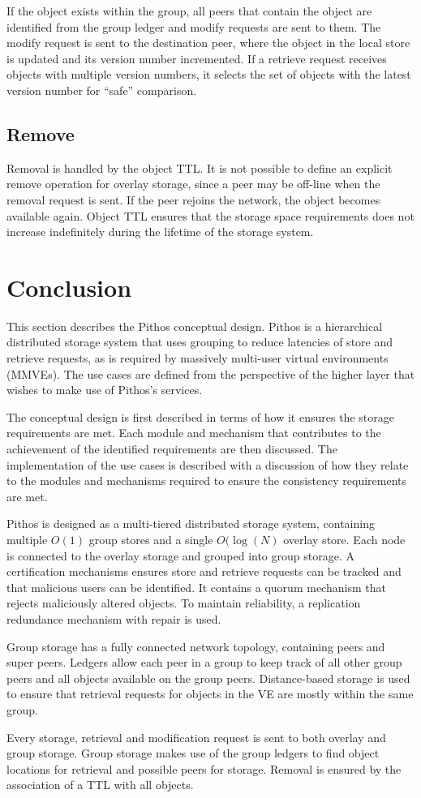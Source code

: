 If the object exists within the group, all peers that contain the object are identified from the group ledger and modify requests are sent to them. The modify request is sent to the destination peer, where the object in the local store is updated and its version number incremented. If a retrieve request receives objects with multiple version numbers, it selects the set of objects with the latest version number for ``safe'' comparison.

\subsection{Remove}
\label{remove_use_case}

Removal is handled by the object TTL. It is not possible to define an explicit remove operation for overlay storage, since a peer may be off-line when the removal request is sent. If the peer rejoins the network, the object becomes available again. Object TTL ensures that the storage space requirements does not increase indefinitely during the lifetime of the storage system.

\section{Conclusion}

This section describes the Pithos conceptual design. Pithos is a hierarchical distributed storage system that uses grouping to reduce latencies of store and retrieve requests, as is required by massively multi-user virtual environments (MMVEs). The use cases are defined from the perspective of the higher layer that wishes to make use of Pithos's services.

The conceptual design is first described in terms of how it ensures the storage requirements are met. Each module and mechanism that contributes to the achievement of the identified requirements are then discussed. The implementation of the use cases is described with a discussion of how they relate to the modules and mechanisms required to ensure the consistency requirements are met.

Pithos is designed as a multi-tiered distributed storage system, containing multiple $O(1)$ group stores and a single $O(\log(N)$ overlay store. Each node is connected to the overlay storage and grouped into group storage. A certification mechanisms ensures store and retrieve requests can be tracked and that malicious users can be identified. It contains a quorum mechanism that rejects maliciously altered objects. To maintain reliability, a replication redundance mechanism with repair is used.

Group storage has a fully connected network topology, containing peers and super peers. Ledgers allow each peer in a group to keep track of all other group peers and all objects available on the group peers. Distance-based storage is used to ensure that retrieval requests for objects in the VE are mostly within the same group.

Every storage, retrieval and modification request is sent to both overlay and group storage. Group storage makes use of the group ledgers to find object locations for retrieval and possible peers for storage. Removal is ensured by the association of a TTL with all objects.
